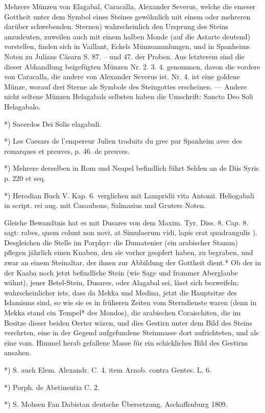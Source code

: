 \documentclass[a4paper, 11pt, oneside, polutonikogreek, german]{article}
\begin{document}
Mehrere Münzen von Elagabal, Caracalla, Alexander Severus, welche die emeser Gottheit unter dem Symbol eines Steines gewöhnlich mit einem oder mehreren darüber schwebenden. Sternen) wahrscheinlich den Ursprung des Steins anzudeuten, zuweilen auch mit einem halben Monde (auf die Astarte deutend) vorstellen, finden sich in Vaillant, Eckels Münzsammlungen, und in Spanheims Noten zu Julians Cäsarn S. 87. -- und 47. der Proben. Aus letzterem sind die dieser Abhandlung beigefügten Münzen Nr. 2. 3. 4. genommen, davon die vordere von Caracalla, die andere von Alexander Severus ist. Nr. 4. ist eine goldene Münze, worauf drei Sterne als Symbole des Steingottes erscheinen. --- Andere nicht seltene Münzen Helagabals selbsten haben die Umschrift: Sancto Deo Soli Helagabalo.

*) Sacerdos Dei Solis elagabali.

*) Les Caesars de l'empereur Julien traduits du grec par Spanheim avec des remarques et preuves, p. 46. de preuves.

*) Mehrere derselben in Rom und Neapel befindlich führt Selden an de Diis Syris p. 220 et seq.

*) Herodian Buch V. Kap. 6. verglichen mit Lampridii vita Antonii. Heliogabali in script. rei aug. mit Casaubons, Salmasius und Gruters Noten.

Gleiche Bewandtnis hat es mit Dusares von dem Maxim. Tyr. Diss. 8. Cap. 8. sagt: rabes, quem colunt non novi, at Simulaerum vidi, lapis erat quadrangulis ). Desgleichen die Stelle im Porphyr: die Dumatenier (ein arabischer Stamm) pflegen jährlich einen Knaben, den sie vorher geopfert haben, zu begraben, und zwar an einem Steinaltar, der ihnen zur Abbildung der Gottheit dient.* Ob der in der Kaaba noch jetzt befindliche Stein (wie Sage und frommer Aberglaube wähnt), jener Betel-Stein, Dusares, oder Alagabal sei, lässt sich bezweifeln; wahrscheinlicher ists, dass da Mekka und Medina, jetzt die Hauptsitze des Islamisms sind, so wie sie es in früheren Zeiten vom Sterndienste waren (denn in Mekka stand ein Tempel* des Mondos), die arabischen Coraischiten, die im Besitze dieser beiden Oerter wären, und dies Gestirn unter dem Bild des Steins verehrten, eine in der Gegend aufgefundene Steinmasse dort aufrichteten, und als eine vom. Himmel herab gefallene Masse für ein schickliches Bild des Gestirns ansahen.

*) S. auch Elem. Alexandr. C. 4. item Arnob. contra Gentes. L. 6.

*) Porph. de Abstinentia C. 2.

*) S. Mohsen Fan Dabistan deutsche Übersetzung. Aschaffenburg 1809.
\end{document}
